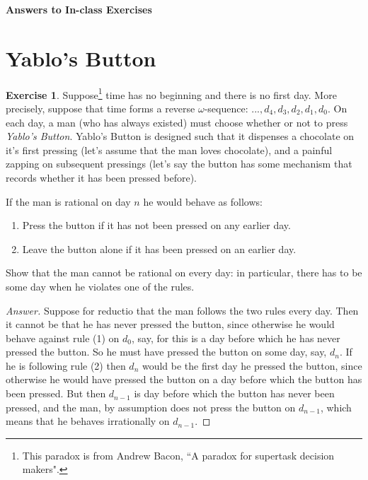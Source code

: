 \documentclass[11pt]{article}
\theoremstyle{definition}
\newtheorem{exer}{Exercise}
\begin{document}




\begin{center}
{\LARGE \bf Answers to In-class Exercises}
\end{center}

\smallskip

\section{Yablo's Button}

\begin{exer}
Suppose\footnote{This paradox is from Andrew Bacon, ``A paradox for supertask decision makers".} time has no beginning and there is no first day. More precisely, suppose that time forms a reverse $\omega$-sequence: $..., d_4, d_3, d_2, d_1, d_0$. On each day, a man (who has always existed) must choose whether or not to press \textit{Yablo's Button}. Yablo's Button is designed such that it dispenses a chocolate on it's first pressing (let's assume that the man loves chocolate), and a painful zapping on subsequent pressings (let's say the button has some mechanism that records whether it has been pressed before). 

If the man is rational on day $n$ he would behave as follows:
\begin{enumerate}[\indent(1)]
\item Press the button if it has not been pressed on any earlier day.
\item Leave the button alone if it has been pressed on an earlier day.
\end{enumerate}

Show that the man cannot be rational on every day: in particular, there has to be some day when he violates one of the rules.
\end{exer}

\begin{proof}[Answer]
Suppose for reductio that the man follows the two rules every day. Then it cannot be that he has never pressed the button, since otherwise he would behave against rule (1) on $d_0$, say, for this is a day before which he has never pressed the button. So he must have pressed the button on some day, say, $d_n$. If he is following rule (2) then $d_n$ would be the first day he pressed the button, since otherwise he would have pressed the button on a day before which the button has been pressed. But then $d_{n-1}$ is day before which the button has never been pressed, and the man, by assumption does not press the button on $d_{n-1}$, which means that he behaves irrationally on $d_{n-1}$.

\end{proof}
\end{document}
